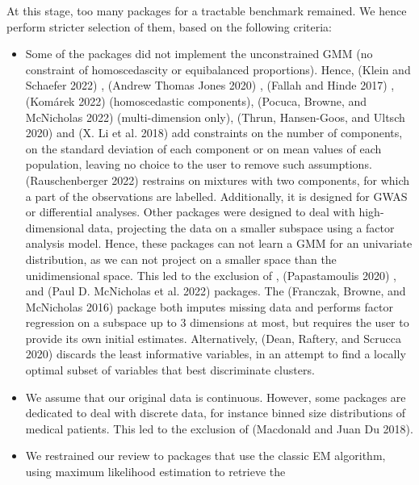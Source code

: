 At this stage, too many packages for a tractable benchmark remained. We
hence perform stricter selection of them, based on the following
criteria:

\begin{itemize}
\item
  Some of the packages did not implement the unconstrained GMM (no
  constraint of homoscedascity or equibalanced proportions). Hence,
   (Klein and Schaefer 2022) , 
  (Andrew Thomas Jones 2020) ,  (Fallah and Hinde 2017) , 
  (Komárek 2022) (homoscedastic components), 
  (Pocuca, Browne, and McNicholas 2022) (multi-dimension only), 
  (Thrun, Hansen-Goos, and Ultsch 2020) and  (X. Li et al. 2018) add
  constraints on the number of components, on the standard deviation
  of each component or on mean values of each population, leaving no
  choice to the user to remove such assumptions. 
  (Rauschenberger 2022) restrains on mixtures with two components, for which a
  part of the observations are labelled. Additionally, it is designed
  for GWAS or differential analyses. Other packages were designed to
  deal with high-dimensional data, projecting the data on a smaller
  subspace using a factor analysis model. Hence, these packages can
  not learn a GMM for an univariate distribution, as we can not
  project on a smaller space than the unidimensional space. This led
  to the exclusion of ,
   (Papastamoulis 2020) ,  and
   (Paul D. McNicholas et al. 2022) packages. The 
  (Franczak, Browne, and McNicholas 2016) package both imputes missing data and performs factor
  regression on a subspace up to 3 dimensions at most, but requires
  the user to provide its own initial estimates. \color{blue} Alternatively,  (Dean, Raftery, and Scrucca 2020) discards the least informative variables, in an attempt to find a locally optimal subset of variables that best discriminate clusters. \color{black}
\item
  We assume that our original data is continuous. However, some
  packages are dedicated to deal with discrete data, for instance
  binned size distributions of medical patients. This led to the
  exclusion of  (Macdonald and Juan Du 2018).
\item
  We restrained our review to packages that use the classic EM
  algorithm, using maximum likelihood estimation to retrieve the

\end{itemize}
